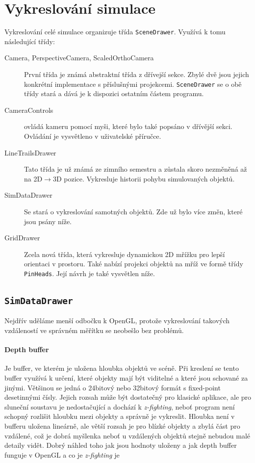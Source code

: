\section{Vykreslování simulace}
Vykreslování celé simulace organizuje třída \texttt{SceneDrawer}. Využívá k tomu následující třídy:
\begin{description}
 	\item[Camera, PerspectiveCamera, ScaledOrthoCamera] První třída je známá abstraktní třída z dřívejší sekce. Zbylé dvě jsou jejich konkrétní implementace s příslušnými projekcemi.
 	\texttt{SceneDrawer} se o obě třídy stará a dává je k dispozici ostatním částem programu.
 	
 	\item[CameraControls] ovládá kameru pomocí myši, které bylo také popsáno v dřívější sekci. Ovládání je vysvětleno v uživatelské příručce.
 	
 	\item[LineTrailsDrawer] Tato třída je už známá ze zimního semestru a zůstala skoro nezměněná až na 2D$ \rightarrow $3D pozice. Vykresluje historii pohybu simulovaných objektů.
 	
 	\item[SimDataDrawer] Se stará o vykreslování samotných objektů. Zde už bylo více změn, které jsou psány níže.
 	
 	\item[GridDrawer] Zcela nová třída, která vykresluje dynamickou 2D mřížku pro lepší orientaci v prostoru. Také nabízí projekci objektů na mříž ve formě třídy \texttt{PinHeads}. Její návrh je také vysvětlen níže.

\end{description}

\subsection{\texttt{SimDataDrawer}}
Nejdřív uděláme menší odbočku k OpenGL, protože vykreslování takových vzdáleností ve správném měřítku se neobešlo bez problémů.
\paragraph{Depth buffer}
\label{par:depthBuffer}
Je buffer, ve kterém je uložena hloubka objektů ve scéně. Při kreslení se tento buffer využívá k určení, které objekty mají být viditelné a které jsou schované za jinými. Většinou se jedná o 24bitový nebo 32bitový formát s fixed-point desetinnými čísly. Jejich rozsah může být dostatečný pro klasické aplikace, ale pro sluneční soustavu je nedostačující a dochází k \textit{z-fighting}, neboť program není schopný rozlišit hloubku mezi objekty a správně je vykreslit.
Hloubka není v bufferu uložena lineárně, ale větší rozsah je pro blízké objekty a zbylá část pro vzdálené, což je dobrá myšlenka neboť u vzdálených objektů stejně nebudou malé detaily vidět. Dobrý náhled toho jak jsou hodnoty uloženy a jak depth buffer funguje v OpenGL a co je \textit{z-fighting} je \cite{depthBuff}

